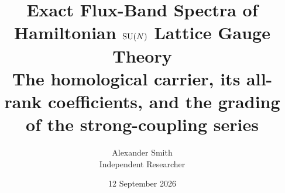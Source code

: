 \documentclass[11pt,letterpaper]{article}
\title{\bfseries Exact Flux-Band Spectra of Hamiltonian \texorpdfstring{$\mathrm{SU}(N)$}{SU(N)}
Lattice Gauge Theory\\[4pt]
\large The homological carrier, its all-rank coefficients,
and the grading of the strong-coupling series}
\author{Alexander Smith\\\small Independent Researcher}
\date{12 September 2026}
\begin{document}
\maketitle

\tableofcontents
\bigskip











\appendix





\end{document}
